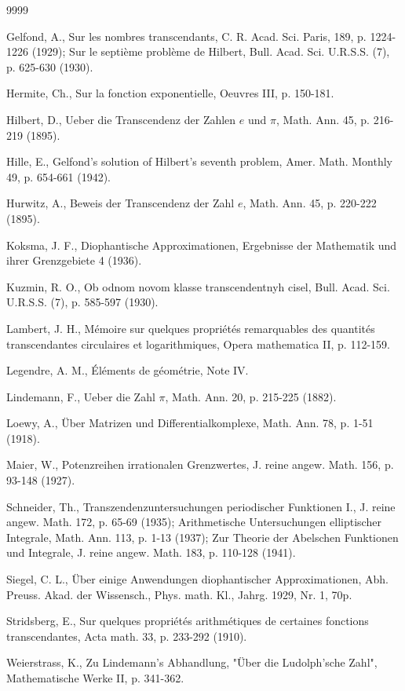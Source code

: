 \begin{thebibliography}{9999}
	
	\setlength{\itemsep}{0.1em} %
	\setlength{\parsep}{0pt}    %

	 Gelfond, A., Sur les nombres transcendants, C. R. Acad. Sci. Paris, 189, p. 1224-1226 (1929); Sur le septième problème de Hilbert, Bull. Acad. Sci. U.R.S.S. (7), p. 625-630 (1930).

	 Hermite, Ch., Sur la fonction exponentielle, Oeuvres III, p. 150-181.

	 Hilbert, D., Ueber die Transcendenz der Zahlen $e$ und $\pi$, Math. Ann. 45, p. 216-219 (1895).

	 Hille, E., Gelfond's solution of Hilbert's seventh problem, Amer. Math. Monthly 49, p. 654-661 (1942).

	 Hurwitz, A., Beweis der Transcendenz der Zahl $e$, Math. Ann. 45, p. 220-222 (1895).

	 Koksma, J. F., Diophantische Approximationen, Ergebnisse der Mathematik und ihrer Grenzgebiete 4 (1936).

	 Kuzmin, R. O., Ob odnom novom klasse transcendentnyh cisel, Bull. Acad. Sci. U.R.S.S. (7), p. 585-597 (1930).

	 Lambert, J. H., Mémoire sur quelques propriétés remarquables des quantités transcendantes circulaires et logarithmiques, Opera mathematica II, p. 112-159.

	 Legendre, A. M., Éléments de géométrie, Note IV.

	 Lindemann, F., Ueber die Zahl $\pi$, Math. Ann. 20, p. 215-225 (1882).

	 Loewy, A., Über Matrizen und Differentialkomplexe, Math. Ann. 78, p. 1-51 (1918).

	 Maier, W., Potenzreihen irrationalen Grenzwertes, J. reine angew. Math. 156, p. 93-148 (1927).

	 Schneider, Th., Transzendenzuntersuchungen periodischer Funktionen I., J. reine angew. Math. 172, p. 65-69 (1935); Arithmetische Untersuchungen elliptischer Integrale, Math. Ann. 113, p. 1-13 (1937); Zur Theorie der Abelschen Funktionen und Integrale, J. reine angew. Math. 183, p. 110-128 (1941).

	 Siegel, C. L., Über einige Anwendungen diophantischer Approximationen, Abh. Preuss. Akad. der Wissensch., Phys. math. Kl., Jahrg. 1929, Nr. 1, 70p.

	 Stridsberg, E., Sur quelques propriétés arithmétiques de certaines fonctions transcendantes, Acta math. 33, p. 233-292 (1910).

	 Weierstrass, K., Zu Lindemann's Abhandlung, "Über die Ludolph'sche Zahl", Mathematische Werke II, p. 341-362.

\end{thebibliography}
